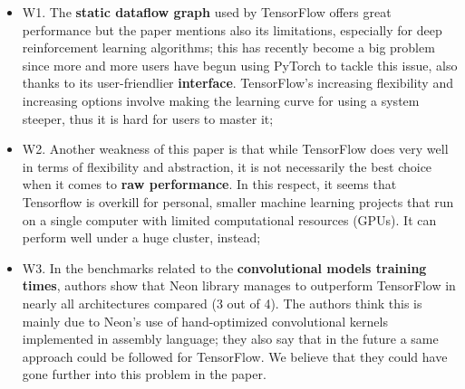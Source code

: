 \documentclass[10pt]{proc}
\begin{document}
\begin{itemize}
 \item W1. The \textbf{static dataflow graph} used by TensorFlow offers great performance but the paper mentions also its limitations, especially for deep reinforcement learning algorithms; this has recently become a big problem since more and more users have begun using PyTorch to tackle this issue, also thanks to its user-friendlier \textbf{interface}. TensorFlow's increasing flexibility and increasing options involve making the learning curve for using a system steeper, thus it is hard for users to master it;
 
 \item W2. Another weakness of this paper is that while TensorFlow does very well in terms of flexibility and abstraction, it is not necessarily the best choice when it comes to \textbf{raw performance}. In this respect, it seems that Tensorflow is overkill for personal, smaller machine learning projects that run on a single computer with limited computational resources (GPUs). It can perform well under a huge cluster, instead;
 
 \item W3. In the benchmarks related to the \textbf{convolutional models training times}, authors show that Neon library manages to outperform TensorFlow in nearly all architectures compared (3 out of 4). The authors think this is mainly due to Neon's use of hand-optimized convolutional kernels implemented in assembly language; they also say that in the future a same approach could be followed for TensorFlow. We believe that they could have gone further into this problem in the paper.
\end{itemize}
\end{document}
